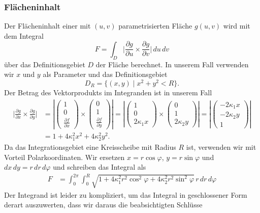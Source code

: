 \subsubsection{Flächeninhalt}
Der Flächeninhalt einer mit $(u,v)$ parametrisierten Fläche $g(u,v)$
wird mit dem Integral
\[
F
=
\int_{D}
\biggr|\frac{\partial g}{\partial u} \times \frac{\partial g}{\partial v}\biggr|
\,du\,dv
\]
über das Definitionsgebiet $D$ der Fläche berechnet.
In unserem Fall verwenden wir $x$ und $y$ als Parameter und das
Definitionsgebiet
\[
D_R = \{ (x,y)\;|\; x^2 + y^2 < R\}.
\]
Der Betrag des Vektorprodukts im Integranden ist in unserem Fall
\begin{align*}
\biggl|
\frac{\partial g}{\partial x}
\times
\frac{\partial g}{\partial y}
\biggr|
&=
\left|
\begin{pmatrix}1\\0\\\frac{\partial f}{\partial x}\end{pmatrix}
\times
\begin{pmatrix}0\\1\\\frac{\partial f}{\partial y}\end{pmatrix}
\right|
=
\left|
\begin{pmatrix}1\\0\\2\kappa_1 x\end{pmatrix}
\times
\begin{pmatrix}0\\1\\2\kappa_2 y\end{pmatrix}
\right|
=
\left|
\begin{pmatrix}-2\kappa_1 x\\-2\kappa_2 y\\1
\end{pmatrix}
\right|
\\
&=
1 + 4\kappa_1^2 x^2 + 4 \kappa_2^2 y^2.
\end{align*}
Da das Integrationsgebiet eine Kreisscheibe mit Radius $R$ ist, verwenden
wir mit Vorteil Polarkoordinaten.
Wir ersetzen $x=r\cos\varphi$, $y=r\sin\varphi$ und $dx\,dy = r\,dr\,d\varphi$
und schreiben das Integral als
\begin{align*}
F
&=
\int_0^{2\pi}
\int_0^R
\sqrt{1 + 4\kappa_1^2 r^2 \cos^2 \varphi + 4\kappa_2^2 r^2\sin^2\varphi}
\,
r\,dr\,d\varphi
\end{align*}
Der Integrand ist leider zu kompliziert, um das Integral in geschlossener
Form derart auszuwerten, dass wir daraus die beabsichtigten Schlüsse
